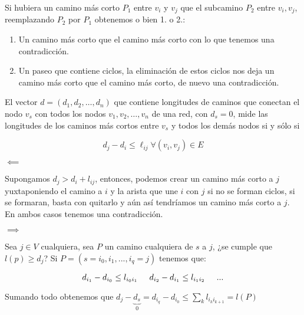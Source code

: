 \documentclass[openany]{book}
\begin{document}
\begin{demonstration}
    Si hubiera un camino más corto $ P_1 $ entre $ v_i $ y $ v_j $ que el subcamino $ P_2 $ entre $ v_i,v_j $, reemplazando $ P_2 $ por $ P_1 $ obtenemos o bien 1. o 2.:
    \begin{enumerate}
        \item Un camino más corto que el camino más corto con lo que tenemos una contradicción.
        \item Un paseo que contiene ciclos, la eliminación de estos ciclos nos deja un camino más corto que el camino más corto, de nuevo una contradicción.
    \end{enumerate}
\end{demonstration}



\begin{theorem}
  El vector $d=\left(d_{1}, d_{2}, \ldots, d_{n}\right)$ que contiene longitudes de caminos que conectan el nodo $v_{s}$ con todos los nodos $v_{1}, v_{2}, \ldots, v_{n}$ de una red, con $d_{s}=0$, mide las longitudes de los caminos más cortos entre $v_{s}$ y todos los demás nodos si y sólo si

  $$
  d_{j}-d_{i} \leq \ell_{i j} \forall\left(v_{i}, v_{j}\right) \in E
  $$
\end{theorem}

\begin{demonstration}
    $ \impliedby $

    Supongamos $ d_j > d_i + l_{ij} $, entonces, podemos crear un camino más corto a $ j $ yuxtaponiendo el camino a $ i $ y la arista que une $ i $ con $ j $ si no se forman ciclos, si se formaran, basta con quitarlo y aún así tendríamos un camino más corto a $ j $. En ambos casos tenemos una contradicción.

    $ \implies $

    Sea $ j \in V $ cualquiera, sea $ P $ un camino cualquiera de $ s $ a $ j $, ¿se cumple que $ l(p) \geq d_j $? Si $ P = (s = i_0,i_1,...,i_{q}=j) $ tenemos que:

    $$ d_{i_1}-d_{i_0} \leq l_{i_0i_1} \hspace{5mm} d_{i_2}-d_{i_1} \leq l_{i_1i_2} \hspace{5mm} ...$$

    Sumando todo obtenemos que $d_j-\underbrace{d_{s}}_{0} = d_{i_q}-d_{i_0} \leq \sum\limits_{k}^{}l_{i_{k}i_{k+1}} = l(P)$

\end{demonstration}
\end{document}
